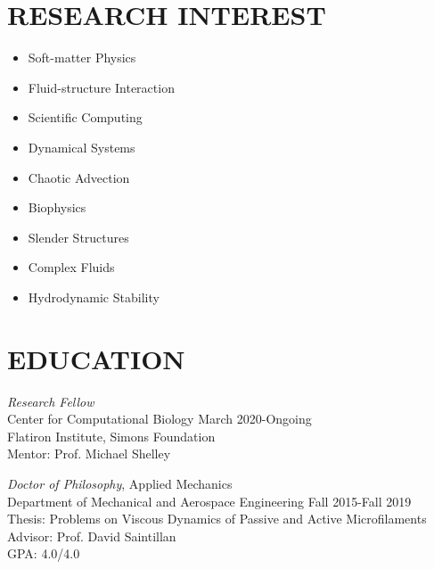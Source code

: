 \documentclass[10pt]{res} %
\begin{document}
\begin{resume}


\section{{RESEARCH INTEREST}}

\vspace{8pt} %

\begin{multicols}{3}
    \begin{itemize}
    	\item[] Soft-matter Physics
    	\item[] Fluid-structure Interaction
    	\item[] Scientific Computing
    	\item[] Dynamical Systems
    	\item[] Chaotic Advection
    	\item[] Biophysics
    	\item[] Slender Structures
    	\item[] Complex Fluids
    	\item[] Hydrodynamic Stability
    \end{itemize}
\end{multicols}


\section{{EDUCATION}} 

\vspace{8pt} %
{\sl Research Fellow} \\
Center for Computational Biology  \hfill March 2020-Ongoing \\
Flatiron Institute, Simons Foundation  \\
Mentor: Prof. Michael Shelley 

{\sl Doctor of Philosophy}, 
Applied Mechanics \\ 
Department of Mechanical and Aerospace Engineering \hfill Fall 2015-Fall 2019 \\ 
Thesis: Problems on Viscous Dynamics of Passive and Active Microfilaments \\
Advisor: Prof. David Saintillan \\
GPA: 4.0/4.0
 

\end{resume}
\end{document}

